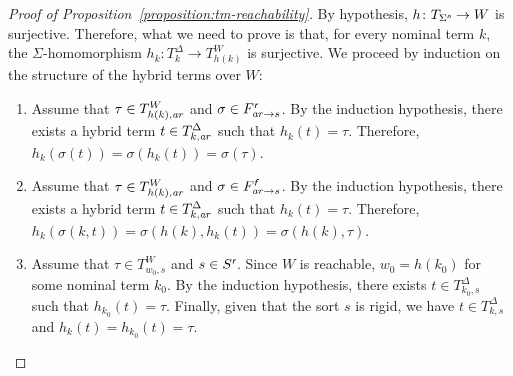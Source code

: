 \documentclass[a4paper,UKenglish,cleveref,autoref]{lipics-v2019}
\begin{document}
\begin{proof}[Proof of Proposition~\ref{proposition:tm-reachability}]
  By hypothesis, \(h \colon T_{\Sigma^{\text{\normalfont\sffamily\itshape n}}} \to W\) is surjective.
  Therefore, what we need to prove is that, for every nominal term \(k\), the \(\Sigma\)-homomorphism \(h_{k} \colon T^{\Delta}_{k} \to T^{W}_{h(k)}\) is surjective.
  We proceed by induction on the structure of the hybrid terms over \(W\):
  \begin{enumerate}
  \item Assume that \(\tau \in T^{W}_{h(k),\mathit{a\mkern -1mu r}}\) and \(\sigma \in F^{\text{\normalfont\sffamily\itshape r}}_{\mathit{a\mkern -1mu r} \to s}\).
    By the induction hypothesis, there exists a hybrid term \(t \in T^{\Delta}_{k,\mathit{a\mkern -1mu r}}\) such that \(h_{k}(t) = \tau\).
    Therefore, \(h_{k}(\sigma(t)) = \sigma(h_{k}(t)) = \sigma(\tau)\).

  \item Assume that \(\tau \in T^{W}_{h(k),\mathit{a\mkern -1mu r}}\) and \(\sigma \in F^{\text{\normalfont\sffamily\itshape f}}_{\mathit{a\mkern -1mu r} \to s}\).
    By the induction hypothesis, there exists a hybrid term \(t \in T^{\Delta}_{k,\mathit{a\mkern -1mu r}}\) such that \(h_{k}(t) = \tau\).
    Therefore, \(h_{k}(\sigma(k, t)) = \sigma(h(k), h_{k}(t)) = \sigma(h(k), \tau)\).

  \item Assume that \(\tau \in T^{W}_{w_{0}, s}\) and \(s \in S^{\text{\normalfont\sffamily\itshape r}}\).
    Since \(W\) is reachable, \(w_{0} = h(k_{0})\) for some nominal term \(k_{0}\).
    By the induction hypothesis, there exists \(t \in T^{\Delta}_{k_{0}, s}\) such that \(h_{k_{0}}(t) = \tau\).
    Finally, given that the sort \(s\) is rigid, we have \(t \in T^{\Delta}_{k, s}\) and \(h_{k}(t) = h_{k_{0}}(t) = \tau\).
    \qedhere
  \end{enumerate}
\end{proof}
\end{document}
